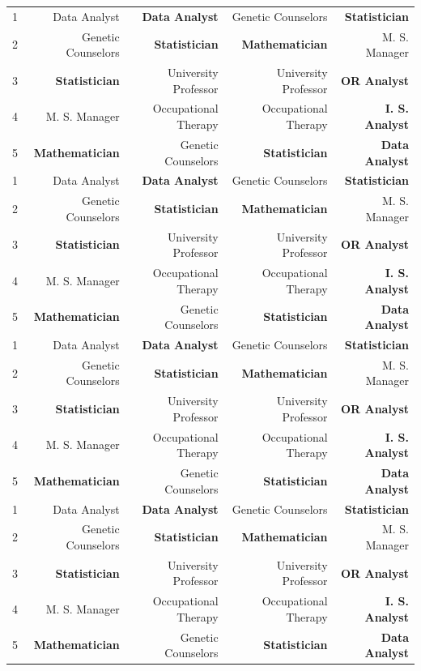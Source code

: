 \documentclass[utf8,12pt]{article} %
\begin{document}
\begin{longtable}{@{}crrrr@{}}
1 & {Data Analyst} & \textbf{Data Analyst}  &  Genetic Counselors & \textbf{Statistician} \\
2 & Genetic Counselors & \textbf{Statistician} & \textbf{Mathematician}  & M. S. Manager \\
3 & \textbf{Statistician} & University Professor  & University Professor & \textbf{OR Analyst}\\
4 &M. S. Manager & Occupational Therapy  & Occupational Therapy & \textbf{I. S. Analyst} \\
5 & \textbf{Mathematician} & Genetic Counselors & \textbf{Statistician} & \textbf{Data Analyst} \\
1 & {Data Analyst} & \textbf{Data Analyst}  &  Genetic Counselors & \textbf{Statistician} \\
2 & Genetic Counselors & \textbf{Statistician} & \textbf{Mathematician}  & M. S. Manager \\
3 & \textbf{Statistician} & University Professor  & University Professor & \textbf{OR Analyst}\\
4 &M. S. Manager & Occupational Therapy  & Occupational Therapy & \textbf{I. S. Analyst} \\
5 & \textbf{Mathematician} & Genetic Counselors & \textbf{Statistician} & \textbf{Data Analyst} \\
1 & {Data Analyst} & \textbf{Data Analyst}  &  Genetic Counselors & \textbf{Statistician} \\
2 & Genetic Counselors & \textbf{Statistician} & \textbf{Mathematician}  & M. S. Manager \\
3 & \textbf{Statistician} & University Professor  & University Professor & \textbf{OR Analyst}\\
4 &M. S. Manager & Occupational Therapy  & Occupational Therapy & \textbf{I. S. Analyst} \\
5 & \textbf{Mathematician} & Genetic Counselors & \textbf{Statistician} & \textbf{Data Analyst} \\
1 & {Data Analyst} & \textbf{Data Analyst}  &  Genetic Counselors & \textbf{Statistician} \\
2 & Genetic Counselors & \textbf{Statistician} & \textbf{Mathematician}  & M. S. Manager \\
3 & \textbf{Statistician} & University Professor  & University Professor & \textbf{OR Analyst}\\
4 &M. S. Manager & Occupational Therapy  & Occupational Therapy & \textbf{I. S. Analyst} \\
5 & \textbf{Mathematician} & Genetic Counselors & \textbf{Statistician} & \textbf{Data Analyst} \\

\end{longtable}
\end{document}
